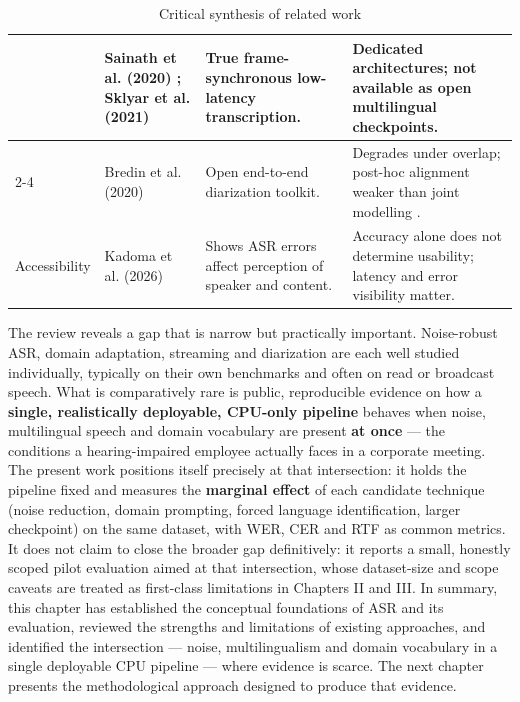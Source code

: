 \documentclass[12pt]{report}
\begin{document}
\begin{table}[htbp]
\begin{tabular}{|p{2.2cm}|p{2.8cm}|p{4.4cm}|p{4.6cm}|}
& Sainath et al. (2020) \cite{sainath2020streaming}; Sklyar et al. (2021) \cite{sklyar2021streaming}
& True frame-synchronous low-latency transcription.
& Dedicated architectures; not available as open multilingual checkpoints. \\ \cline{2-4}
& Bredin et al. (2020) \cite{bredin2020pyannote}
& Open end-to-end diarization toolkit.
& Degrades under overlap; post-hoc alignment weaker than joint modelling \cite{raj2021integration}. \\ \hline
\multirow{1}{2.2cm}{Accessibility}
& Kadoma et al. (2026) \cite{kadoma2026lost}
& Shows ASR errors affect perception of speaker and content.
& Accuracy alone does not determine usability; latency and error visibility matter. \\ \hline
\end{tabular}
\caption{Critical synthesis of related work}
\label{tab:sota_synthesis}
\end{table}
The review reveals a gap that is narrow but practically important. Noise-robust ASR, domain adaptation, streaming and diarization are each well studied individually, typically on their own benchmarks and often on read or broadcast speech. What is comparatively rare is public, reproducible evidence on how a \textbf{single, realistically deployable, CPU-only pipeline} behaves when noise, multilingual speech and domain vocabulary are present \textbf{at once} --- the conditions a hearing-impaired employee actually faces in a corporate meeting. The present work positions itself precisely at that intersection: it holds the pipeline fixed and measures the \textbf{marginal effect} of each candidate technique (noise reduction, domain prompting, forced language identification, larger checkpoint) on the same dataset, with WER, CER and RTF as common metrics. It does not claim to close the broader gap definitively: it reports a small, honestly scoped pilot evaluation aimed at that intersection, whose dataset-size and scope caveats are treated as first-class limitations in Chapters II and III.
\vspace{0.5em}
In summary, this chapter has established the conceptual foundations of ASR and its evaluation, reviewed the strengths and limitations of existing approaches, and identified the intersection --- noise, multilingualism and domain vocabulary in a single deployable CPU pipeline --- where evidence is scarce. The next chapter presents the methodological approach designed to produce that evidence.
\end{document}
